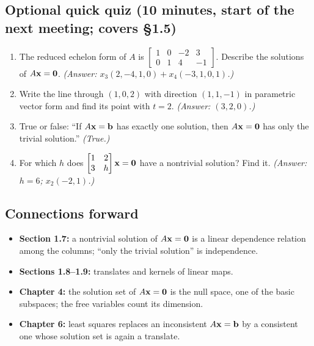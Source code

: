 \documentclass[11pt]{article}
\begin{document}
\subsection*{Optional quick quiz (10 minutes, start of the next meeting; covers \S1.5)}
\begin{enumerate}
 \item The reduced echelon form of $A$ is $\begin{bmatrix}1&0&-2&3\\0&1&4&-1\end{bmatrix}$. Describe the solutions of $A\mathbf{x}=\mathbf{0}$. \emph{(Answer: $x_3(2,-4,1,0)+x_4(-3,1,0,1)$.)}
 \item Write the line through $(1,0,2)$ with direction $(1,1,-1)$ in parametric vector form and find its point with $t=2$. \emph{(Answer: $(3,2,0)$.)}
 \item True or false: ``If $A\mathbf{x}=\mathbf{b}$ has exactly one solution, then $A\mathbf{x}=\mathbf{0}$ has only the trivial solution.'' \emph{(True.)}
 \item For which $h$ does $\begin{bmatrix}1&2\\3&h\end{bmatrix}\mathbf{x}=\mathbf{0}$ have a nontrivial solution? Find it. \emph{(Answer: $h=6$; $x_2(-2,1)$.)}
\end{enumerate}

\subsection*{Connections forward}
\begin{itemize}
 \item \textbf{Section 1.7:} a nontrivial solution of $A\mathbf{x}=\mathbf{0}$ is a linear dependence relation among the columns; ``only the trivial solution'' is independence.
 \item \textbf{Sections 1.8--1.9:} translates and kernels of linear maps.
 \item \textbf{Chapter 4:} the solution set of $A\mathbf{x}=\mathbf{0}$ is the null space, one of the basic subspaces; the free variables count its dimension.
 \item \textbf{Chapter 6:} least squares replaces an inconsistent $A\mathbf{x}=\mathbf{b}$ by a consistent one whose solution set is again a translate.
\end{itemize}
\end{document}
